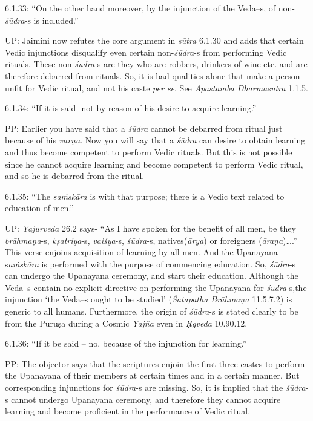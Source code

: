 6.1.33: “On the other hand moreover, by the injunction of the Veda--s, of non-\textit{śūdra}-s is included.”

UP: Jaimini now refutes the core argument in \textit{sūtra} 6.1.30 and adds that certain Vedic injunctions disqualify even certain non-\textit{śūdra}-s from performing Vedic rituals. These non-\textit{śūdra}-s are they who are robbers, drinkers of wine etc. and are therefore debarred from rituals. So, it is bad qualities alone that make a person unfit for Vedic ritual, and not his caste \textit{per se}. See \textit{Āpastamba Dharmasūtra} 1.1.5.

6.1.34: “If it is said- not by reason of his desire to acquire learning.”

PP: Earlier you have said that a \textit{śūdra} cannot be debarred from ritual just because of his \textit{varṇa}. Now you will say that a \textit{śūdra} can desire to obtain learning and thus become competent to perform Vedic rituals. But this is not possible since he cannot acquire learning and become competent to perform Vedic ritual, and so he is debarred from the ritual.

6.1.35: “The \textit{saṁskāra} is with that purpose; there is a Vedic text related to education of men.”

UP: \textit{Yajurveda} 26.2 says- “As I have spoken for the benefit of all men, be they \textit{brāhmaṇa}-s, \textit{kṣatriya}-s, \textit{vaiśya}-s, \textit{śūdra}-s, natives(\textit{ārya}) or foreigners (\textit{āraṇa})….” This verse enjoins acquisition of learning by all men. And the Upanayana s\textit{aṁskāra} is performed with the purpose of commencing education. So, \textit{śūdra}-s can undergo the Upanayana ceremony, and start their education. Although the Veda--s contain no explicit directive on performing the Upanayana for \textit{śūdra}-s,\break the injunction ‘the Veda--s ought to be studied’ (\textit{Śatapatha Brāhmaṇa} 11.5.7.2) is generic to all humans. Furthermore, the origin of \textit{śūdra}-s is stated clearly to be from the Puruṣa during a Cosmic \textit{Yajña} even in \textit{Ṛgveda} 10.90.12.

6.1.36: “If it be said – no, because of the injunction for learning.”

PP: The objector says that the scriptures enjoin the first three castes to perform the Upanayana of their members at certain times and in a certain manner. But corresponding injunctions for \textit{śūdra}-s are missing. So, it is implied that the \textit{śūdra}-s cannot undergo Upanayana ceremony, and therefore they cannot acquire learning and become proficient in the performance of Vedic ritual.

